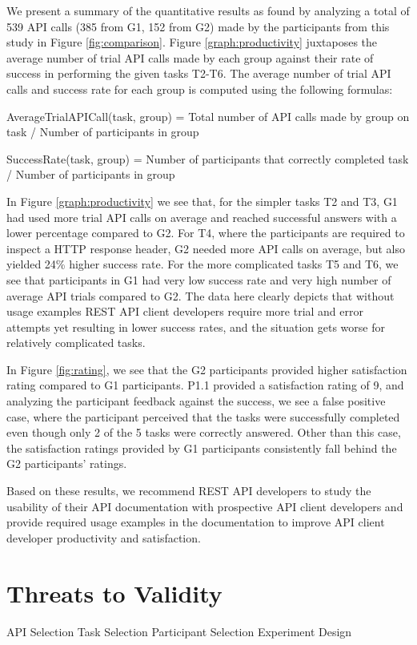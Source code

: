 \documentclass[conference]{IEEEtran}
\begin{document}
We present a summary of the quantitative results as found by analyzing a total of 539 API calls (385 from G1, 152 from G2) made by the participants from this study in Figure \ref{fig:comparison}. Figure \ref{graph:productivity} juxtaposes the average number of trial API calls made by each group against their rate of success in performing the given tasks T2-T6. The average number of trial API calls and success rate for each group is computed using the following formulas:

AverageTrialAPICall(task, group) = Total number of API calls made by group on task / Number of participants in group

SuccessRate(task, group) = Number of participants that correctly completed task / Number of participants in group

In Figure \ref{graph:productivity} we see that, for the simpler tasks T2 and T3, G1 had used more trial API calls on average and reached successful answers with a lower percentage compared to G2. For T4, where the participants are required to inspect a HTTP response header, G2 needed more API calls on average, but also yielded 24\% higher success rate. For the more complicated tasks T5 and T6, we see that participants in G1 had very low success rate and very high number of average API trials compared to G2. The data here clearly depicts that without usage examples REST API client developers require more trial and error attempts yet resulting in lower success rates, and the situation gets worse for relatively complicated tasks.

In Figure \ref{fig:rating}, we see that the G2 participants provided higher satisfaction rating compared to G1 participants. P1.1 provided a satisfaction rating of 9, and analyzing the participant feedback against the success, we see a false positive case, where the participant perceived that the tasks were successfully completed even though only 2 of the 5 tasks were correctly answered. Other than this case, the satisfaction ratings provided by G1 participants consistently fall behind the G2 participants' ratings.

Based on these results, we recommend REST API developers to study the usability of their API documentation with prospective API client developers and provide required usage examples in the documentation to improve API client developer productivity and satisfaction.


\section{Threats to Validity}
  API Selection
  Task Selection
  Participant Selection
  Experiment Design
\end{document}
